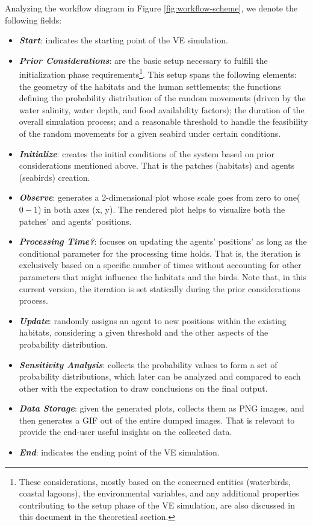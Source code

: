 Analyzing the workflow diagram in Figure \ref{fig:workflow-scheme}, we denote the following fields:
\begin{itemize}
    \item \textbf{\textit{Start}}: indicates the starting point of the VE simulation.
    \item \textbf{\textit{Prior Considerations}}: are the basic setup necessary to fulfill the initialization phase requirements\footnote{These considerations, mostly based on the concerned entities (waterbirds, coastal lagoons), the environmental variables, and any additional properties contributing to the setup phase of the VE simulation, are also discussed in this document in the theoretical section.}. This setup spans the following elements: the geometry of the habitats and the human settlements; the functions defining the probability distribution of the random movements (driven by the water salinity, water depth, and food availability factors); the duration of the overall simulation process; and a reasonable threshold to handle the feasibility of the random movements for a given seabird under certain conditions.
    \item \textbf{\textit{Initialize}}: creates the initial conditions of the system based on prior considerations mentioned above. That is the patches (habitats) and agents (seabirds) creation.
    \item \textbf{\textit{Observe}}: generates a 2-dimensional plot whose scale goes from zero to one(\emph{$0-1$}) in both axes (x, y). The rendered plot helps to visualize both the patches' and agents' positions.
    \item \textbf{\textit{Processing Time?}}: focuses on updating the agents' positions' as long as the conditional parameter for the processing time holds. That is, the iteration is exclusively based on a specific number of times without accounting for other parameters that might influence the habitats and the birds. Note that, in this current version, the iteration is set statically during the prior considerations process.
    \item \textbf{\textit{Update}}: randomly assigns an agent to new positions within the existing habitats, considering a given threshold and the other aspects of the probability distribution.
    \item \textbf{\textit{Sensitivity Analysis}}: collects the probability values to form a set of probability distributions, which later can be analyzed and compared to each other with the expectation to draw conclusions on the final output.
    \item \textbf{\textit{Data Storage}}: given the generated plots, collects them as PNG images, and then generates a GIF out of the entire dumped images. That is relevant to provide the end-user useful insights on the collected data.
    \item \textbf{\textit{End}}: indicates the ending point of the VE simulation.
\end{itemize}

